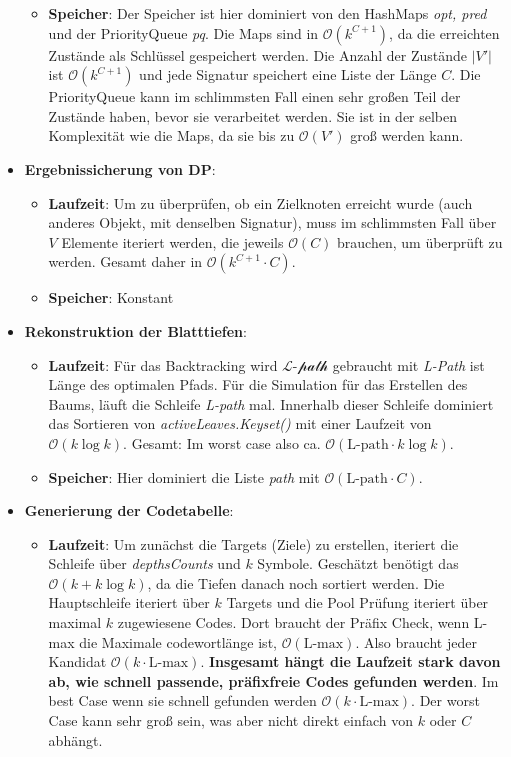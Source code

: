 \documentclass[a4paper,10pt,ngerman]{scrartcl}
\begin{document}
\begin{itemize}
\begin{itemize}
    \item \textbf{Speicher}:
    Der Speicher ist hier dominiert von den HashMaps \textit{opt, pred} und der PriorityQueue \textit{pq}. Die Maps sind in $\mathcal{O}(k^{C+1})$, da die erreichten Zustände als Schlüssel gespeichert werden. Die Anzahl der Zustände $|V'|$ ist $\mathcal{O}(k^{C+1})$ und jede Signatur speichert eine Liste der Länge $C$. Die PriorityQueue kann im schlimmsten Fall einen sehr großen Teil der Zustände haben, bevor sie verarbeitet werden. Sie ist in der selben Komplexität wie die Maps, da sie bis zu $\mathcal{O}(V')$ groß werden kann.
  \end{itemize}
  \item \textbf{Ergebnissicherung von DP}:
  \begin{itemize}
    \item \textbf{Laufzeit}:
    Um zu überprüfen, ob ein Zielknoten erreicht wurde (auch anderes Objekt, mit denselben Signatur), muss im schlimmsten Fall über $V$ Elemente iteriert werden, die jeweils $\mathcal{O}(C)$ brauchen, um überprüft zu werden. Gesamt daher in $\mathcal{O}(k^{C+1} \cdot C)$.
    \item \textbf{Speicher}: Konstant
  \end{itemize}
  \item \textbf{Rekonstruktion der Blatttiefen}:
  \begin{itemize}
    \item \textbf{Laufzeit}:
    Für das Backtracking wird $\mathcal{\text{L-path}}$ gebraucht mit \textit{L-Path} ist Länge des optimalen Pfads. Für die Simulation für das Erstellen des Baums, läuft die Schleife \textit{L-path} mal. Innerhalb dieser Schleife dominiert das Sortieren von \textit{activeLeaves.Keyset()} mit einer Laufzeit von $\mathcal{O}(k \log k)$. Gesamt: Im worst case also ca. $\mathcal{O}(\text{L-path}\cdot k \log k)$.
    \item \textbf{Speicher}:
    Hier dominiert die Liste \textit{path} mit $\mathcal{O}(\text{L-path} \cdot C)$.
  \end{itemize}
  \item \textbf{Generierung der Codetabelle}:
  \begin{itemize}
    \item \textbf{Laufzeit}:
    Um zunächst die Targets (Ziele) zu erstellen, iteriert die Schleife über \textit{depthsCounts} und $k$ Symbole. Geschätzt benötigt das $\mathcal{O}(k+ k\log k)$, da die Tiefen danach noch sortiert werden. Die Hauptschleife iteriert über $k$ Targets und die Pool Prüfung iteriert über maximal $k$ zugewiesene Codes. Dort braucht der Präfix Check, wenn L-max die Maximale codewortlänge ist, $\mathcal{O}(\text{L-max})$. Also braucht jeder Kandidat $\mathcal{O}(k\cdot \text{L-max})$. \textbf{Insgesamt hängt die Laufzeit stark davon ab, wie schnell passende, präfixfreie Codes gefunden werden}. Im best Case wenn sie schnell gefunden werden $\mathcal{O}(k\cdot \text{L-max})$. Der worst Case kann sehr groß sein, was aber nicht direkt einfach von $k$ oder $C$ abhängt.

\end{itemize}
\end{itemize}
\end{document}
